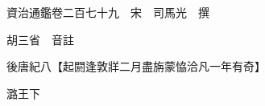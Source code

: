 










 


 
 


 

  
  
  
  
  





  
  
  
  
  
 
  

  

  
  
  



  

 
 

  
   




  

  
  


  　　資治通鑑卷二百七十九　宋　司馬光　撰

　　胡三省　音註

　　後唐紀八【起閼逢敦牂二月盡旃蒙恊洽凡一年有奇】

　　潞王下

